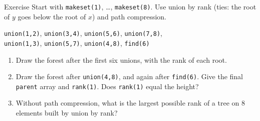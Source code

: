 \documentclass[10pt,aspectratio=169]{beamer}
\begin{document}
\begin{frame}{Exercise}
  Start with \texttt{makeset(1)}, \ldots, \texttt{makeset(8)}. Use union by
  rank (ties: the root of $y$ goes below the root of $x$) and path
  compression.

  \bigskip
  \begin{center}
  \texttt{union(1,2)}, \texttt{union(3,4)}, \texttt{union(5,6)},
  \texttt{union(7,8)}, \\
  \texttt{union(1,3)}, \texttt{union(5,7)}, \texttt{union(4,8)},
  \texttt{find(6)}
  \end{center}

  \bigskip
  \begin{enumerate}
    \item Draw the forest after the first six unions, with the rank of each
          root.
    \item Draw the forest after \texttt{union(4,8)}, and again after
          \texttt{find(6)}. Give the final \texttt{parent} array and
          \texttt{rank(1)}. Does \texttt{rank(1)} equal the height?
    \item Without path compression, what is the largest possible rank of a
          tree on $8$ elements built by union by rank?
  \end{enumerate}
\end{frame}
\end{document}
